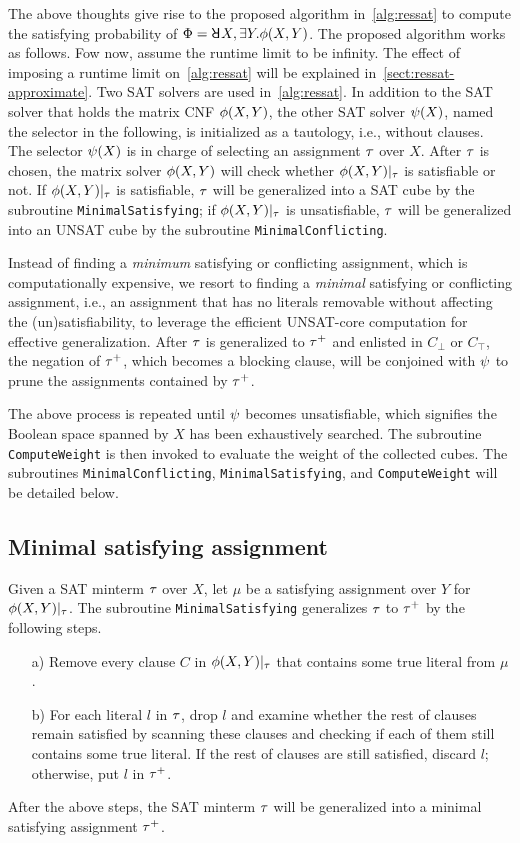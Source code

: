 The above thoughts give rise to the proposed algorithm in~\cref{alg:ressat} to compute the satisfying probability of $\Qf=\random{} X,\exists Y.\pf(X,Y)$.
The proposed algorithm works as follows.
Fow now, assume the runtime limit \timeout to be infinity.
The effect of imposing a runtime limit on~\cref{alg:ressat} will be explained in~\cref{sect:ressat-approximate}.
Two SAT solvers are used in~\cref{alg:ressat}.
In addition to the SAT solver that holds the matrix CNF $\phi(X,Y)$,
the other SAT solver $\psi(X)$, named the selector in the following,
is initialized as a tautology, i.e., without clauses.
The selector $\psi(X)$ is in charge of selecting an assignment $\tau$ over $X$.
After $\tau$ is chosen, the matrix solver $\phi(X,Y)$ will check whether $\phi(X,Y)|_{\tau}$ is satisfiable or not.
If $\phi(X,Y)|_{\tau}$ is satisfiable,
$\tau$ will be generalized into a SAT cube by the subroutine \texttt{MinimalSatisfying};
if $\phi(X,Y)|_{\tau}$ is unsatisfiable,
$\tau$ will be generalized into an UNSAT cube by the subroutine \texttt{MinimalConflicting}.

Instead of finding a \textit{minimum} satisfying or conflicting assignment,
which is computationally expensive,
we resort to finding a \textit{minimal} satisfying or conflicting assignment,
i.e., an assignment that has no literals removable without affecting the (un)satisfiability,
to leverage the efficient UNSAT-core computation for effective generalization.
After $\tau$ is generalized to $\tau^+$ and enlisted in $C_\bot$ or $C_\top$,
the negation of $\tau^+$, which becomes a blocking clause,
will be conjoined with $\psi$ to prune the assignments contained by $\tau^+$.

The above process is repeated until $\psi$ becomes unsatisfiable,
which signifies the Boolean space spanned by $X$ has been exhaustively searched.
The subroutine \texttt{ComputeWeight} is then invoked to evaluate the weight of the collected cubes.
The subroutines \texttt{MinimalConflicting}, \texttt{MinimalSatisfying}, and \texttt{ComputeWeight} will be detailed below.

\subsection{Minimal satisfying assignment}
Given a SAT minterm $\tau$ over $X$,
let $\mu$ be a satisfying assignment over $Y$ for $\phi(X,Y)|_{\tau}$.
The subroutine \texttt{MinimalSatisfying} generalizes $\tau$ to $\tau^+$ by the following steps.
\begin{itemize}
    \item[a)] Remove every clause $C$ in $\phi(X,Y)|_{\tau}$ that contains some true literal from $\mu$.
    \item[b)] For each literal $l$ in $\tau$, drop $l$ and examine whether the rest of clauses remain satisfied
          by scanning these clauses and checking if each of them still contains some true literal.
          If the rest of clauses are still satisfied, discard $l$; otherwise, put $l$ in $\tau^+$.
\end{itemize}
After the above steps, the SAT minterm $\tau$ will be generalized into a minimal satisfying assignment $\tau^+$.

